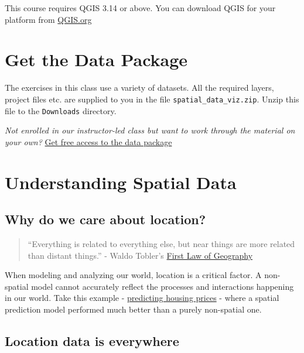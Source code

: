 \documentclass[
  12pt,
  a4paper]{article}
\begin{document}
This course requires QGIS 3.14 or above. You can download QGIS for your
platform from \href{https://qgis.org/}{QGIS.org}

\hypertarget{get-the-data-package}{%
\section{Get the Data Package}\label{get-the-data-package}}

The exercises in this class use a variety of datasets. All the required
layers, project files etc. are supplied to you in the file
\texttt{spatial\_data\_viz.zip}. Unzip this file to the
\texttt{Downloads} directory.

\emph{Not enrolled in our instructor-led class but want to work through
the material on your own?}
\href{https://docs.google.com/forms/d/e/1FAIpQLSdwB5I9PdheF8V4yOSeoGSkmEdBZoe4R9CyFQVzlFH-pTl6FQ/viewform}{Get
free access to the data package}

\hypertarget{understanding-spatial-data}{%
\section{Understanding Spatial Data}\label{understanding-spatial-data}}

\hypertarget{why-do-we-care-about-location}{%
\subsection{Why do we care about
location?}\label{why-do-we-care-about-location}}

\begin{quote}
``Everything is related to everything else, but near things are more
related than distant things.'' - Waldo Tobler's
\href{https://en.wikipedia.org/wiki/Tobler\%27s_first_law_of_geography}{First
Law of Geography}
\end{quote}

When modeling and analyzing our world, location is a critical factor. A
non-spatial model cannot accurately reflect the processes and
interactions happening in our world. Take this example -
\href{https://medium.com/geoai/using-forest-based-classification-regression-to-model-and-estimate-house-values-5a0e26682c42}{predicting
housing prices} - where a spatial prediction model performed much better
than a purely non-spatial one.

\hypertarget{location-data-is-everywhere}{%
\subsection{Location data is
everywhere}\label{location-data-is-everywhere}}
\end{document}
